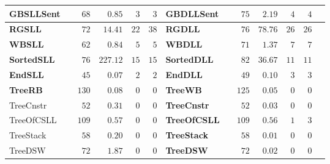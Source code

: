 \documentclass{beamer}
\newcommand{\hcol}[1]{yellow!20!orange!20}
\newcommand{\ucol}[1]{red!50}
\newcommand{\scol}[1]{blue!40}
\begin{document}
\begin{frame}
\begin{center}
\begin{adjustbox}{max height=\textheight, max width=\textwidth}
\begin{tabular}{| l | l | r | r | r | r || l | l | r | r | r | r | r |}
        \hline
		\rowcolor{\hcol{}}
		\textbf{GBSLLSent}   & \cellcolor{\scol{}} \safe  & $68$ & $0.85$   &  $3$ & $3$ & \textbf{GBDLLSent} & \cellcolor{\scol{}} \safe & $75$ &  $2.19$  & $4$ & $4$ \\
        \hline
		\rowcolor{\hcol{}}
		\textbf{RGSLL}       & \cellcolor{\scol{}} \safe & $72$ & $14.41$  &  $22$  & $38$ & \textbf{RGDLL} & \cellcolor{\scol{}} \safe & $76$ &  $78.76$ & $26$ & $26$ \\
        \hline
		\rowcolor{\hcol{}}
		\textbf{WBSLL}       & \cellcolor{\scol{}} \safe & $62$ & $0.84$   &  $5$  & $5$ & \textbf{WBDLL} & \cellcolor{\scol{}} \safe & $71$ &  $1.37$  & $7$ & $7$ \\
        \hline
		\rowcolor{\hcol{}}
		\textbf{SortedSLL}   & \cellcolor{\scol{}} \safe & $76$ & $227.12$ &  $15$ & $15$ & \textbf{SortedDLL} & \cellcolor{\scol{}} \safe & $82$ &  $36.67$ & $11$ & $11$ \\
        \hline
		\rowcolor{\hcol{}}
		\textbf{EndSLL}      & \cellcolor{\scol{}} \safe  & $45$ & $0.07$   &  $2$  & $2$ & \textbf{EndDLL} & \cellcolor{\scol{}} \safe & $49$ &  $0.10$  & $3$ & $3$ \\
        \hline
		\rowcolor{\hcol{}}
		\textbf{TreeRB} & \cellcolor{\ucol{}}\unsafe & $130$ &  $0.08$  & $0$  & $0$ & \textbf{TreeWB} & \cellcolor{\ucol{}}\unsafe & $125$ &  $0.05$  & $0$ & $0$ \\
        \hline
		TreeCnstr & \cellcolor{\scol{}} \safe & $52$ & $0.31$  & $0$  & $0$ & \cellcolor{\hcol{}}\textbf{TreeCnstr} & \cellcolor{\ucol{}}\unsafe & \cellcolor{\hcol{}} $52$ & \cellcolor{\hcol{}} $0.03$  & \cellcolor{\hcol{}} $0$ & \cellcolor{\hcol{}} $0$ \\
        \hline
		TreeOfCSLL & \cellcolor{\scol{}} \safe & $109$ &  $0.57$  & $0$  & $0$ & \cellcolor{\hcol{}}\textbf{TreeOfCSLL}  & \cellcolor{\ucol{}}\unsafe & \cellcolor{\hcol{}} $109$ & \cellcolor{\hcol{}} $0.56$  & \cellcolor{\hcol{}} $1$ & \cellcolor{\hcol{}} $3$ \\
        \hline
		TreeStack & \cellcolor{\scol{}} \safe & $58$ &  $0.20$  & $0$  & $0$ & \cellcolor{\hcol{}}\textbf{TreeStack} & \cellcolor{\ucol{}}\unsafe & \cellcolor{\hcol{}} $58$ & \cellcolor{\hcol{}} $0.01$  & \cellcolor{\hcol{}} $0$ & \cellcolor{\hcol{}} $0$ \\
        \hline
		TreeDSW   & \cellcolor{\scol{}} \safe & $72$ & $1.87$  & $0$  & $0$ & \cellcolor{\hcol{}}\textbf{TreeDSW} & \cellcolor{\ucol{}}\unsafe & \cellcolor{\hcol{}} $72$ & \cellcolor{\hcol{}} $0.02$  & \cellcolor{\hcol{}} $0$ &  \cellcolor{\hcol{}} $0$ \\

\end{tabular}
\end{adjustbox}
\end{center}
\end{frame}
\end{document}
